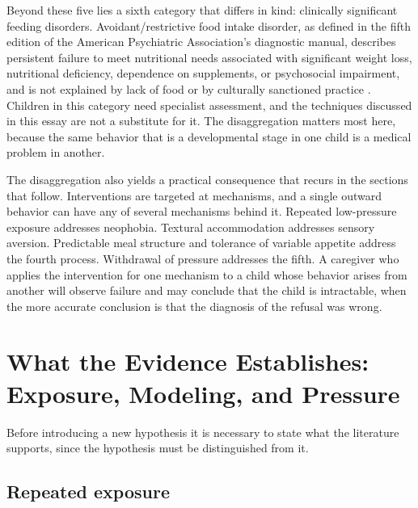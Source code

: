 \documentclass[11pt]{article}
\theoremstyle{remark}
\begin{document}
Beyond these five lies a sixth category that differs in kind: clinically significant feeding disorders. Avoidant/restrictive food intake disorder, as defined in the fifth edition of the American Psychiatric Association's diagnostic manual, describes persistent failure to meet nutritional needs associated with significant weight loss, nutritional deficiency, dependence on supplements, or psychosocial impairment, and is not explained by lack of food or by culturally sanctioned practice \citep{apa2013dsm5}. Children in this category need specialist assessment, and the techniques discussed in this essay are not a substitute for it. The disaggregation matters most here, because the same behavior that is a developmental stage in one child is a medical problem in another.

The disaggregation also yields a practical consequence that recurs in the sections that follow. Interventions are targeted at mechanisms, and a single outward behavior can have any of several mechanisms behind it. Repeated low-pressure exposure addresses neophobia. Textural accommodation addresses sensory aversion. Predictable meal structure and tolerance of variable appetite address the fourth process. Withdrawal of pressure addresses the fifth. A caregiver who applies the intervention for one mechanism to a child whose behavior arises from another will observe failure and may conclude that the child is intractable, when the more accurate conclusion is that the diagnosis of the refusal was wrong.

\section{What the Evidence Establishes: Exposure, Modeling, and Pressure}\label{sec:evidence}

Before introducing a new hypothesis it is necessary to state what the literature supports, since the hypothesis must be distinguished from it.

\subsection{Repeated exposure}
\end{document}
